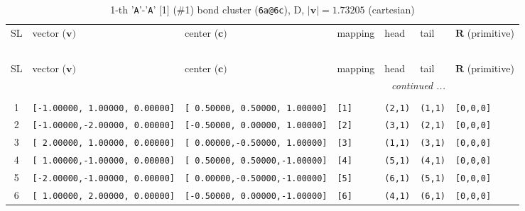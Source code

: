\documentclass[fleqn,10pt,landscape]{jsarticle}
\begin{document}
\renewcommand{\arraystretch}{1.6}
\begin{longtable}[l]{cllllll}
\captionsetup{justification=raggedright, singlelinecheck=off}
\caption{1-th '\texttt{A}'-'\texttt{A}' [1] (\#1) bond cluster (\texttt{6a@6c}), D, $|\bm{v}|=1.73205$ (cartesian)}
 \\
 \hline \hline
SL & vector ($\bm{v})$ & center ($\bm{c})$ & mapping & head & tail & $\bm{R}$ (primitive) \\ \hline \endfirsthead

\multicolumn{6}{l}{\tablename\ \thetable{}} \\
 \hline \hline
SL & vector ($\bm{v})$ & center ($\bm{c})$ & mapping & head & tail & $\bm{R}$ (primitive) \\ \hline \endhead

 \hline \hline
\multicolumn{6}{r}{\footnotesize\it continued ...} \\ \endfoot

 \hline \hline
\multicolumn{6}{r}{} \\ \endlastfoot

1 & \texttt{[-1.00000, 1.00000, 0.00000]} & \texttt{[ 0.50000, 0.50000, 1.00000]} & \texttt{[1]} & \texttt{(2,1)} & \texttt{(1,1)} & \texttt{[0,0,0]} \\ \hline
2 & \texttt{[-1.00000,-2.00000, 0.00000]} & \texttt{[-0.50000, 0.00000, 1.00000]} & \texttt{[2]} & \texttt{(3,1)} & \texttt{(2,1)} & \texttt{[0,0,0]} \\ \hline
3 & \texttt{[ 2.00000, 1.00000, 0.00000]} & \texttt{[ 0.00000,-0.50000, 1.00000]} & \texttt{[3]} & \texttt{(1,1)} & \texttt{(3,1)} & \texttt{[0,0,0]} \\ \hline
4 & \texttt{[ 1.00000,-1.00000, 0.00000]} & \texttt{[ 0.50000, 0.50000,-1.00000]} & \texttt{[4]} & \texttt{(5,1)} & \texttt{(4,1)} & \texttt{[0,0,0]} \\ \hline
5 & \texttt{[-2.00000,-1.00000, 0.00000]} & \texttt{[ 0.00000,-0.50000,-1.00000]} & \texttt{[5]} & \texttt{(6,1)} & \texttt{(5,1)} & \texttt{[0,0,0]} \\ \hline
6 & \texttt{[ 1.00000, 2.00000, 0.00000]} & \texttt{[-0.50000, 0.00000,-1.00000]} & \texttt{[6]} & \texttt{(4,1)} & \texttt{(6,1)} & \texttt{[0,0,0]} \\
\end{longtable}
\renewcommand{\arraystretch}{1.6}
\end{document}
